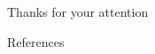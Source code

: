 \documentclass{beamer}
\begin{document}
  \begin{frame}
  
  \begin{center}
  Thanks for your attention
  \end{center}
  
  \end{frame}
  \begin{frame}{References}
      
      {\tiny

}


  \end{frame}

 
  
\end{document}
